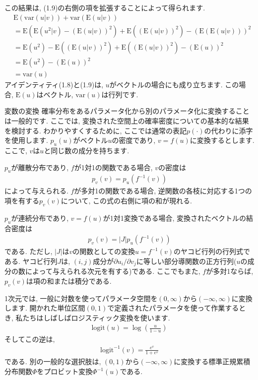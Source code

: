 \documentclass[10pt,dvipdfmx,a4]{beamer}
\newcommand{\eq}[1]{\begin{align}#1\end{align}}
\newcommand{\eqn}[1]{\begin{align*}#1\end{align*}}
\begin{document}

\begin{frame}
この結果は, (1.9)の右側の項を拡張することによって得られます.
\eqn{&\text{E}(\text{var}(u|v))+\text{var}(\text{E}(u|v))\\
&=\text{E}(\text{E}(u^2|v)-(\text{E}(u|v))^2)+\text{E}((\text{E}(u|v))^2)-(\text{E}(\text{E}(u|v)))^2\\
&=\text{E}(u^2)-\text{E}((\text{E}(u|v))^2)+\text{E}((\text{E}(u|v))^2)-(\text{E}(u))^2\\
&=\text{E}(u^2)-(\text{E}(u))^2\\
&=\text{var}(u)}
アイデンティティ(1.8)と(1.9)は, $u$がベクトルの場合にも成り立ちます.
この場合, $\text{E}(u)$はベクトル, $\text{var}(u)$は行列です.
\end{frame}


\begin{frame}{変数の変換}
確率分布をあるパラメータ化から別のパラメータ化に変換することは一般的です.
ここでは, 変換された空間上の確率密度についての基本的な結果を検討する.
わかりやすくするために, ここでは通常の表記$p(\cdot)$の代わりに添字を使用します.
$p_u(u)$がベクトル$u$の密度であり, $v=f(u)$に変換するとします.
ここで, $v$は$u$と同じ数の成分を持ちます.

$p_u$が離散分布であり, $f$が1対1の関数である場合, $v$の密度は
\eqn{p_v(v)=p_u(f^{-1}(v))}
によって与えられる.
$f$が多対1の関数である場合, 逆関数の各枝に対応する1つの項を有する$p_v(v)$について, この式の右側に項の和が現れる.

$p_u$が連続分布であり, $v=f(u)$が1対1変換である場合, 変換されたベクトルの結合密度は
\eqn{p_v(v)=|J|p_u(f^{-1}(v))}
である.
ただし, $|J|$は$v$の関数としての変換$u=f^{-1}(v)$のヤコビ行列の行列式である.
ヤコビ行列$J$は, $(i,j)$成分が$\partial u_i/\partial v_j$に等しい部分導関数の正方行列($u$の成分の数によって与えられる次元を有する)である.
ここでもまた, $f$が多対1ならば, $p_v(v)$は項の和または積分である.
\end{frame}


\begin{frame}
1次元では, 一般に対数を使ってパラメータ空間を$(0,\infty)$から$(-\infty,\infty)$に変換します.
開かれた単位区間$(0,1)$で定義されたパラメータを使って作業するとき, 私たちはしばしばロジスティック変換を使います.
\eq{\text{logit}(u)=\log \left(\frac{u}{1-u}\right)}
そしてこの逆は,
\eqn{\text{logit}^{-1}(v)=\frac{e^v}{1+e^v}}
である.
別の一般的な選択肢は, $(0,1)$から$(-\infty,\infty)$に変換する標準正規累積分布関数$\Phi$をプロビット変換$\Phi^{-1}(u)$である.\end{frame}
\end{document}
